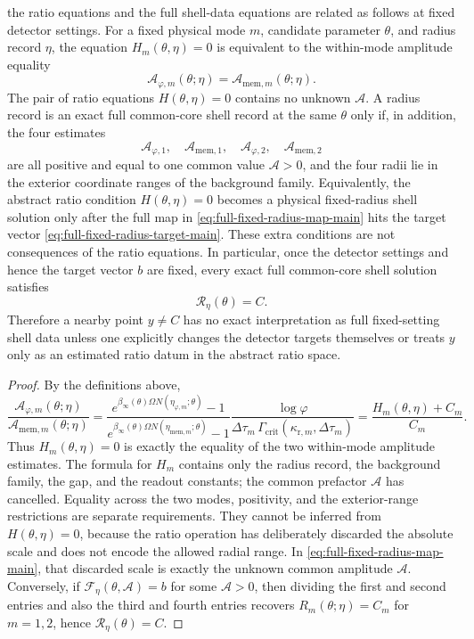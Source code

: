 \begin{lemma}\label{lem:ratio-admissibility-main}
\ResponseStandingClause the ratio equations and the full
shell-data equations are related as follows at fixed detector settings.
For a fixed physical mode $m$, candidate parameter $\theta$, and radius record
$\eta$, the equation $H_m(\theta,\eta)=0$ is equivalent to the within-mode
amplitude equality
\[
\mathcal A_{\varphi,m}(\theta;\eta)=\mathcal A_{{\mathrm{mem}},m}(\theta;\eta).
\]
The pair of ratio equations $H(\theta,\eta)=0$ contains no unknown
$\mathcal A$. A radius record is an exact full common-core shell record at the
same $\theta$ only if, in addition, the four estimates
\[
\mathcal A_{\varphi,1},\quad \mathcal A_{{\mathrm{mem}},1},\quad
\mathcal A_{\varphi,2},\quad \mathcal A_{{\mathrm{mem}},2}
\]
are all positive and equal to one common value $\mathcal A>0$, and the four
radii lie in the exterior coordinate ranges of the background family.
Equivalently, the abstract ratio condition $H(\theta,\eta)=0$ becomes a
physical fixed-radius shell solution only after the full map in
\eqref{eq:full-fixed-radius-map-main} hits the target vector
\eqref{eq:full-fixed-radius-target-main}. These extra conditions are not
consequences of the ratio equations. In particular, once the detector settings
and hence the target vector $b$ are fixed, every exact full common-core shell
solution satisfies
\[
\mathcal R_\eta(\theta)=C.
\]
Therefore a nearby point $y\neq C$ has no exact interpretation as full
fixed-setting shell data unless one explicitly changes the detector targets
themselves or treats $y$ only as an estimated ratio datum in the abstract ratio
space.
\end{lemma}

\begin{proof}
By the definitions above,
\[
\frac{\mathcal A_{\varphi,m}(\theta;\eta)}
{\mathcal A_{{\mathrm{mem}},m}(\theta;\eta)}
=
\frac{e^{\beta_\infty(\theta)\Omega N(\eta_{\varphi,m};\theta)}-1}
     {e^{\beta_\infty(\theta)\Omega N(\eta_{{\mathrm{mem}},m};\theta)}-1}
\frac{\log\varphi}
{\Delta\tau_m\,\Gamma_{\mathrm{crit}}(\kappa_{{\mathrm r},m},\Delta\tau_m)}
=\frac{H_m(\theta,\eta)+C_m}{C_m}.
\]
Thus $H_m(\theta,\eta)=0$ is exactly the equality of the two within-mode
amplitude estimates. The formula for $H_m$ contains only the radius record, the
background family, the gap, and the readout constants; the common prefactor
$\mathcal A$ has cancelled. Equality across the two modes, positivity, and the
exterior-range restrictions are separate requirements. They cannot be inferred
from $H(\theta,\eta)=0$, because the ratio operation has deliberately discarded
the absolute scale and does not encode the allowed radial range. In
\eqref{eq:full-fixed-radius-map-main}, that discarded scale is exactly the
unknown common amplitude $\mathcal A$. Conversely, if
$\mathcal F_\eta(\theta,\mathcal A)=b$ for some $\mathcal A>0$, then dividing
the first and second entries and also the third and fourth entries recovers
$R_m(\theta;\eta)=C_m$ for $m=1,2$, hence $\mathcal R_\eta(\theta)=C$.
\end{proof}

